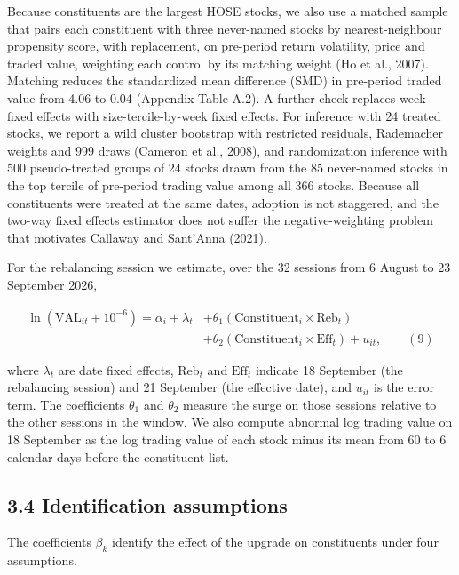 Because constituents are the largest HOSE stocks, we also use a matched
sample that pairs each constituent with three never-named stocks by
nearest-neighbour propensity score, with replacement, on pre-period
return volatility, price and traded value, weighting each control by its
matching weight (Ho et al., 2007). Matching reduces the standardized
mean difference (SMD) in pre-period traded value from 4.06 to 0.04
(Appendix Table A.2). A further check replaces week fixed effects with
size-tercile-by-week fixed effects. For inference with 24 treated
stocks, we report a wild cluster bootstrap with restricted residuals,
Rademacher weights and 999 draws (Cameron et al., 2008), and
randomization inference with 500 pseudo-treated groups of 24 stocks
drawn from the 85 never-named stocks in the top tercile of pre-period
trading value among all 366 stocks. Because all constituents were
treated at the same dates, adoption is not staggered, and the two-way
fixed effects estimator does not suffer the negative-weighting problem
that motivates Callaway and Sant'Anna (2021).

For the rebalancing session we estimate, over the 32 sessions from 6
August to 23 September 2026,

\[\begin{aligned} \ln\left(\mathrm{VAL}_{it} + 10^{-6}\right) = \alpha_i + \lambda_t &+ \theta_1\left(\mathrm{Constituent}_i \times \mathrm{Reb}_t\right) \\ &+ \theta_2\left(\mathrm{Constituent}_i \times \mathrm{Eff}_t\right) + u_{it}, \qquad (9) \end{aligned}\]

where \(\lambda_t\) are date fixed effects, \(\mathrm{Reb}_t\) and
\(\mathrm{Eff}_t\) indicate 18 September (the rebalancing session) and
21 September (the effective date), and \(u_{it}\) is the error term. The
coefficients \(\theta_1\) and \(\theta_2\) measure the surge on those
sessions relative to the other sessions in the window. We also compute
abnormal log trading value on 18 September as the log trading value of
each stock minus its mean from 60 to 6 calendar days before the
constituent list.

\hypertarget{identification-assumptions}{%
\subsection{3.4 Identification
assumptions}\label{identification-assumptions}}

The coefficients \(\beta_k\) identify the effect of the upgrade on
constituents under four assumptions.

